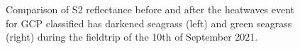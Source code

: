 \documentclass[
  number]{elsarticle}
\begin{document}
\label{cell-fig-S2_comparison}
\begin{figure}[H]


\caption{\label{fig-S2_comparison}Comparison of S2 reflectance before
and after the heatwaves event for GCP classified has darkened seagrass
(left) and green seagrass (right) during the fieldtrip of the 10th of
September 2021.}

\end{figure}%


\renewcommand\refname{Bibliography}
  
\end{document}
